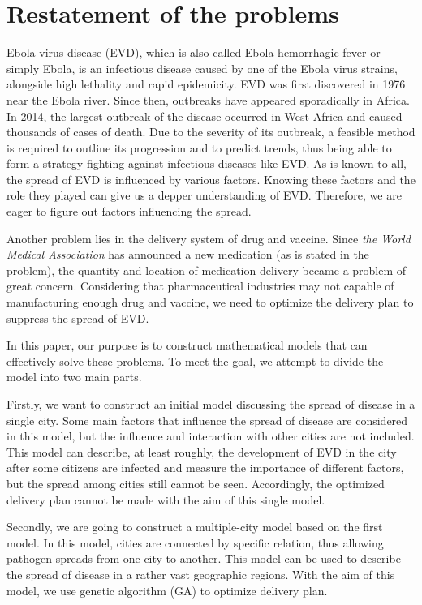 \section{Restatement of the problems}

\par Ebola virus disease (EVD), which is also called Ebola hemorrhagic fever or simply Ebola, is an infectious disease caused by one of the Ebola virus strains, alongside high lethality and rapid epidemicity. EVD was first discovered in 1976 near the Ebola river. Since then, outbreaks have appeared sporadically in Africa. In 2014, the largest outbreak of the disease occurred in West Africa and caused thousands of cases of death.\cite{CDC} Due to the severity of its outbreak, a feasible method is required to outline its progression and to predict trends, thus being able to form a strategy fighting against infectious diseases like EVD.
As is known to all, the spread of EVD is influenced by various factors. Knowing these factors and the role they played can give us a depper understanding of EVD. Therefore, we are eager to figure out factors influencing the spread.

Another problem lies in the delivery system of drug and vaccine. Since \emph{the World Medical Association} has announced a new medication (as is stated in the problem), the quantity and location of medication delivery became a problem of great concern. Considering that pharmaceutical industries may not capable of manufacturing enough drug and vaccine, we need to optimize the delivery plan to suppress the spread of EVD.

In this paper, our purpose is to construct mathematical models that can effectively solve these problems. To meet the goal, we attempt to divide the model into two main parts.

Firstly, we want to construct an initial model discussing the spread of disease in a single city. Some main factors that influence the spread of disease are considered in this model, but the influence and interaction with other cities are not included. This model can describe, at least roughly, the development of EVD in the city after some citizens are infected and measure the importance of different factors, but the spread among cities still cannot be seen. Accordingly, the optimized delivery plan cannot be made with the aim of this single model.

Secondly, we are going to construct a multiple-city model based on the first model. In this model, cities are connected by specific relation, thus allowing pathogen spreads from one city to another. This model can be used to describe the spread of disease in a rather vast geographic regions. With the aim of this model, we use genetic algorithm (GA) to optimize delivery plan.
